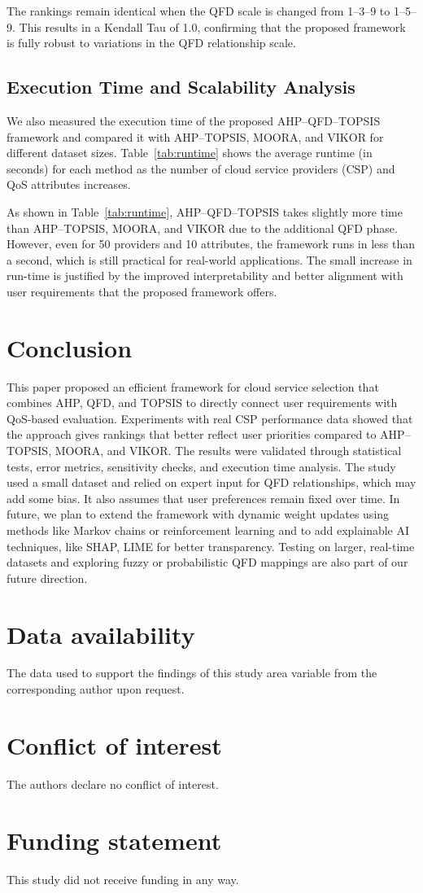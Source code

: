 \documentclass[twocolumn]{svjour3}
\begin{document}
The rankings remain identical when the QFD scale is changed from 1--3--9 to 1--5--9. This results in a Kendall Tau of 1.0, confirming that the proposed framework is fully robust to variations in the QFD relationship scale.



\subsection{Execution Time and Scalability Analysis}

We also measured the execution time of the proposed AHP--QFD--TOPSIS framework and compared it with AHP--TOPSIS, MOORA, and VIKOR for different dataset sizes. Table~\ref{tab:runtime} shows the average runtime (in seconds) for each method as the number of cloud service providers (CSP) and QoS attributes increases.

As shown in Table~\ref{tab:runtime}, AHP--QFD--TOPSIS takes slightly more time than AHP--TOPSIS, MOORA, and VIKOR due to the additional QFD phase. However, even for 50 providers and 10 attributes, the framework runs in less than a second, which is still practical for real-world applications. The small increase in run-time is justified by the improved interpretability and better alignment with user requirements that the proposed framework offers.


\section{Conclusion}

This paper proposed an efficient framework for cloud service selection that combines AHP, QFD, and TOPSIS to directly connect user requirements with QoS-based evaluation. Experiments with real CSP performance data showed that the approach gives rankings that better reflect user priorities compared to AHP--TOPSIS, MOORA, and VIKOR. The results were validated through statistical tests, error metrics, sensitivity checks, and execution time analysis. The study used a small dataset and relied on expert input for QFD relationships, which may add some bias. It also assumes that user preferences remain fixed over time. In future, we plan to extend the framework with dynamic weight updates using methods like Markov chains or reinforcement learning and to add explainable AI techniques, like SHAP, LIME for better transparency. Testing on larger, real-time datasets and exploring fuzzy or probabilistic QFD mappings are also part of our future direction.
\section*{Data availability}
The data used to support the findings of this study area variable from the corresponding author upon request.
\section*{Conflict of interest}
The authors declare no conflict of interest.
\section*{Funding statement}
This study did not receive funding in any way.



      
\end{document}
